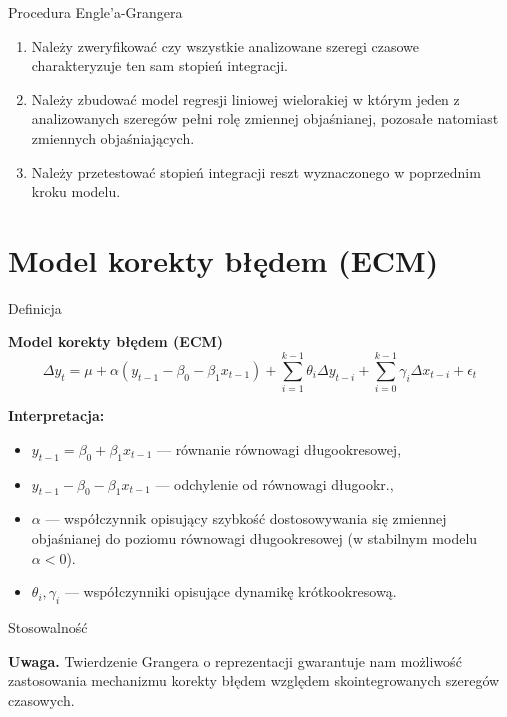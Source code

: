 \documentclass[a4paper, 11pt]{beamer}
\begin{document}
	\begin{frame}{Procedura Engle'a-Grangera}
		\begin{enumerate}
			\item Należy zweryfikować czy wszystkie analizowane szeregi czasowe 
				charakteryzuje ten sam stopień integracji.
			\item Należy zbudować model regresji liniowej wielorakiej w którym 
				jeden z analizowanych szeregów pełni rolę zmiennej objaśnianej, 
				pozosałe natomiast zmiennych objaśniających.
			\item Należy przetestować stopień integracji reszt wyznaczonego w 
				poprzednim kroku modelu.
		\end{enumerate}
	\end{frame}
	
	\section{Model korekty błędem (ECM)}
	
	\begin{frame}{Definicja}
		\begin{block}{\textbf{Model korekty błędem (ECM)}}
			\[
				\Delta y_{t} =
					\mu +
					\alpha \left(y_{t-1} - \beta_{0} - \beta_{1} x_{t-1}\right) + 
					\sum_{i=1}^{k-1} \theta_{i} \Delta y_{t-i} + 
					\sum_{i=0}^{k-1} \gamma_{i} \Delta x_{t-i} + 
					\epsilon_{t}
			\]
		\end{block}
		\textbf{Interpretacja:}
		\begin{itemize}
			\item $y_{t-1} = \beta_{0} + \beta_{1} x_{t-1}$ --- równanie równowagi
				długookresowej,
			\item $y_{t-1} - \beta_{0} - \beta_{1} x_{t-1}$ --- odchylenie od 
				równowagi długookr.,
			\item $\alpha$ --- współczynnik opisujący szybkość dostosowywania się 
				zmiennej objaśnianej do poziomu równowagi długookresowej (w 
				stabilnym modelu $\alpha < 0$).
			\item $\theta_{i}, \gamma_{i}$ --- współczynniki opisujące dynamikę
				krótkookresową.
		\end{itemize}
	\end{frame}
	
	\begin{frame}{Stosowalność}
		\begin{alert}{\textbf{Uwaga.}}
			Twierdzenie Grangera o reprezentacji gwarantuje nam możliwość
			zastosowania mechanizmu korekty błędem względem skointegrowanych
			szeregów czasowych.
		\end{alert}
	\end{frame}
	
\end{document}

